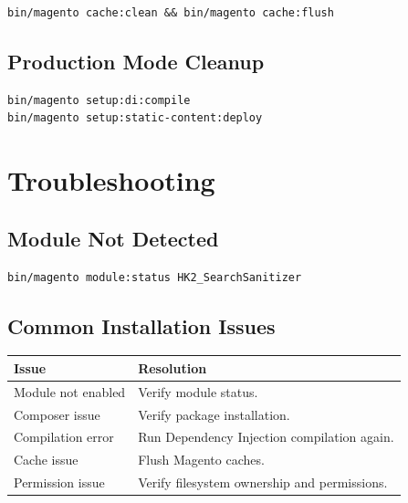 \documentclass[11pt,a4paper]{article}
\begin{document}
\begin{lstlisting}[style=shell]
bin/magento cache:clean && bin/magento cache:flush
\end{lstlisting}

\subsection{Production Mode Cleanup}

\begin{lstlisting}[style=shell]
bin/magento setup:di:compile
bin/magento setup:static-content:deploy
\end{lstlisting}

\section{Troubleshooting}

\subsection{Module Not Detected}

\begin{lstlisting}[style=shell]
bin/magento module:status HK2_SearchSanitizer
\end{lstlisting}

\subsection{Common Installation Issues}

\begin{longtable}{ll}
\toprule
\textbf{Issue} & \textbf{Resolution} \\
\midrule
\endhead
Module not enabled & Verify module status. \\
Composer issue & Verify package installation. \\
Compilation error & Run Dependency Injection compilation again. \\
Cache issue & Flush Magento caches. \\
Permission issue & Verify filesystem ownership and permissions. \\
\bottomrule
\end{longtable}

\end{document}
